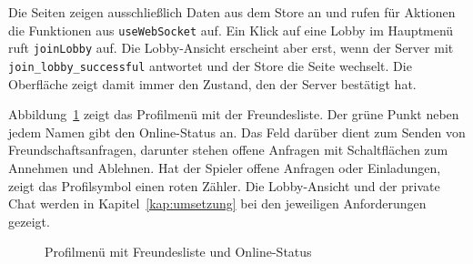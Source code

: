 Die Seiten zeigen ausschließlich Daten aus dem Store an und rufen für Aktionen die Funktionen aus \texttt{useWebSocket} auf. Ein Klick auf eine Lobby im Hauptmenü ruft \texttt{joinLobby} auf. Die Lobby-Ansicht erscheint aber erst, wenn der Server mit \texttt{join\_lobby\_successful} antwortet und der Store die Seite wechselt. Die Oberfläche zeigt damit immer den Zustand, den der Server bestätigt hat.

Abbildung~\ref{fig:freunde} zeigt das Profilmenü mit der Freundesliste. Der grüne Punkt neben jedem Namen gibt den Online-Status an. Das Feld darüber dient zum Senden von Freundschaftsanfragen, darunter stehen offene Anfragen mit Schaltflächen zum Annehmen und Ablehnen. Hat der Spieler offene Anfragen oder Einladungen, zeigt das Profilsymbol einen roten Zähler. Die Lobby-Ansicht und der private Chat werden in Kapitel~\ref{kap:umsetzung} bei den jeweiligen Anforderungen gezeigt.

\begin{figure}[ht]
  \centering
  \caption{Profilmenü mit Freundesliste und Online-Status}
  \label{fig:freunde}
\end{figure}
